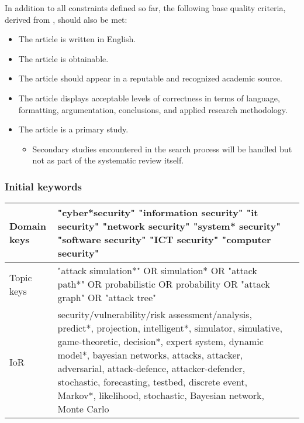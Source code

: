 \documentclass{article}
\begin{document}
\noindent In addition to all constraints defined so far, the following base quality criteria, derived from \cite[p~19]{Kitchenham07}, should also be met:

\begin{itemize}
    \item The article is written in English.
    \item The article is obtainable.
    \item The article should appear in a reputable and recognized academic source.
    \item The article displays acceptable levels of correctness in terms of language, formatting, argumentation, conclusions, and applied research methodology.
    \item The article is a primary study.
    \begin{itemize}
        \item Secondary studies encountered in the search process will be handled but not as part of the systematic review itself.
    \end{itemize}
\end{itemize}

\subsubsection{Initial keywords}
\begin{center}
\begin{tabular}{ | m{1.2cm} | m{28em}| m{1.5cm} | }
\hline
Domain keys & "cyber*security" "information security" "it security" "network security" "system* security" "software security" "ICT security" "computer security"\\
\hline
Topic keys & "attack simulation*" OR simulation* OR "attack path*" OR probabilistic OR probability OR "attack graph" OR "attack tree"\\
\hline
IoR & security/vulnerability/risk assessment/analysis, predict*, projection, intelligent*, simulator, simulative, game-theoretic, decision*, expert system, dynamic model*, bayesian networks, attacks, attacker, adversarial, attack-defence, attacker-defender, stochastic, forecasting, testbed, discrete event, Markov*, likelihood, stochastic, Bayesian network, Monte Carlo\\
\hline
\end{tabular}
\end{center}

\end{document}
